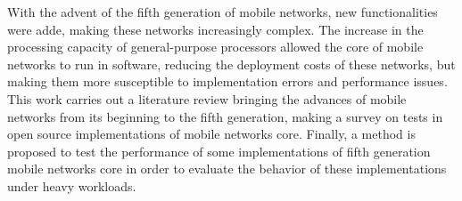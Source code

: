 With the advent of the fifth generation of mobile networks, new functionalities were adde, making these networks increasingly complex.
The increase in the processing capacity of general-purpose processors allowed the core of mobile networks to run in software, reducing the deployment costs of these networks, but making them more susceptible to implementation errors and performance issues.
This work carries out a literature review bringing the advances of mobile networks from its beginning to the fifth generation, making a survey on tests in open source implementations of mobile networks core.
Finally, a method is proposed to test the performance of some implementations of fifth generation mobile networks core in order to evaluate the behavior of these implementations under heavy workloads.